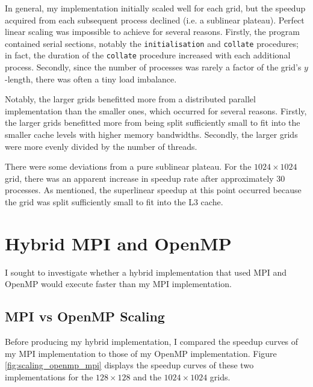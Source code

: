 \documentclass[twocolumn, a4paper]{article}
\begin{document}
In general, my implementation initially scaled well for each grid, but the speedup acquired from each subsequent process declined (i.e. a sublinear plateau).
Perfect linear scaling was impossible to achieve for several reasons.
Firstly, the program contained serial sections, notably the \texttt{initialisation} and \texttt{collate} procedures; in fact, the duration of the \texttt{collate} procedure increased with each additional process.
Secondly, since the number of processes was rarely a factor of the grid's $y$-length, there was often a tiny load imbalance.

Notably, the larger grids benefitted more from a distributed parallel implementation than the smaller ones, which occurred for several reasons.
Firstly, the larger grids benefitted more from being split sufficiently small to fit into the smaller cache levels with higher memory bandwidths.
Secondly, the larger grids were more evenly divided by the number of threads.

There were some deviations from a pure sublinear plateau.
For the $1024\times1024$ grid, there was an apparent increase in speedup rate after approximately 30 processes.
As mentioned, the superlinear speedup at this point occurred because the grid was split sufficiently small to fit into the L3 cache.

\section{Hybrid MPI and OpenMP}

I sought to investigate whether a hybrid implementation that used MPI and OpenMP would execute faster than my MPI implementation.

\subsection{MPI vs OpenMP Scaling}

Before producing my hybrid implementation, I compared the speedup curves of my MPI implementation to those of my OpenMP implementation.
Figure \ref{fig:scaling_openmp_mpi} displays the speedup curves of these two implementations for the $128 \times 128$ and the $1024 \times 1024$ grids.
\end{document}
